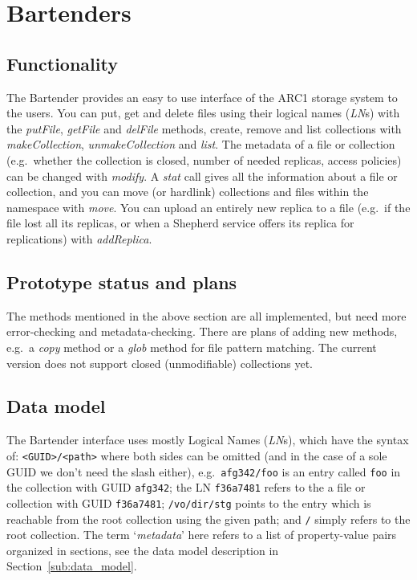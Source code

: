 \documentclass{book}
\begin{document}
\newpage

\section{Bartenders} %
\label{sec:bartenders}

\subsection{Functionality} %

The Bartender provides an easy to use interface of the ARC1 storage system to the users. You can put, get and delete files using their logical names (\emph{LN}s) with the \emph{putFile}, \emph{getFile} and \emph{delFile} methods, create, remove and list collections with \emph{makeCollection}, \emph{unmakeCollection} and \emph{list}. The metadata of a file or collection (e.g.~whether the collection is closed, number of needed replicas, access policies) can be changed with \emph{modify}. A \emph{stat} call gives all the information about a file or collection, and you can move (or hardlink) collections and files within the namespace with \emph{move}. You can upload an entirely new replica to a file (e.g.~if the file lost all its replicas, or when a Shepherd service offers its replica for replications) with \emph{addReplica}.


\subsection{Prototype status and plans} %

The methods mentioned in the above section are all implemented, but need more error-checking and metadata-checking. There are plans of adding new methods, e.g.~a \emph{copy} method or a \emph{glob} method for file pattern matching. The current version does not support closed (unmodifiable) collections yet.


\subsection{Data model} %

The Bartender interface uses mostly Logical Names (\emph{LN}s), which have the syntax of: \verb!<GUID>/<path>! where both sides can be omitted (and in the case of a sole GUID we don't need the slash either), e.g.~\verb!afg342/foo! is an entry called \verb!foo! in the collection with GUID \verb!afg342!; the LN \verb!f36a7481! refers to the a file or collection with GUID \verb!f36a7481!; \verb!/vo/dir/stg! points to the entry which is reachable from the root collection using the given path; and \verb!/! simply refers to the root collection.
The term `\emph{metadata}' here refers to a list of property-value pairs organized in sections, see the data model description in Section~\ref{sub:data_model}.
\end{document}
